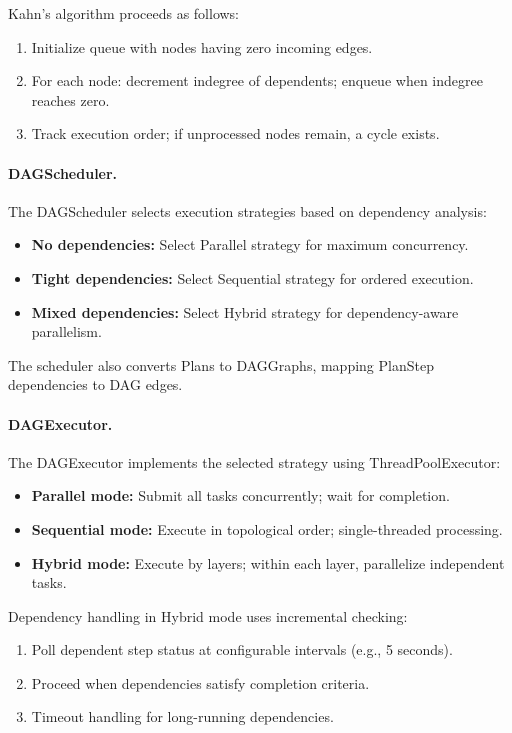 \documentclass{article}
\theoremstyle{definition}
\begin{document}
Kahn's algorithm proceeds as follows:
\begin{enumerate}[leftmargin=1.5em]
    \item Initialize queue with nodes having zero incoming edges.
    \item For each node: decrement indegree of dependents; enqueue when indegree reaches zero.
    \item Track execution order; if unprocessed nodes remain, a cycle exists.
\end{enumerate}

\paragraph{DAGScheduler.}
The DAGScheduler selects execution strategies based on dependency analysis:
\begin{itemize}[leftmargin=1.5em]
    \item \textbf{No dependencies:} Select Parallel strategy for maximum concurrency.
    \item \textbf{Tight dependencies:} Select Sequential strategy for ordered execution.
    \item \textbf{Mixed dependencies:} Select Hybrid strategy for dependency-aware parallelism.
\end{itemize}

The scheduler also converts Plans to DAGGraphs, mapping PlanStep dependencies to DAG edges.

\paragraph{DAGExecutor.}
The DAGExecutor implements the selected strategy using ThreadPoolExecutor:
\begin{itemize}[leftmargin=1.5em]
    \item \textbf{Parallel mode:} Submit all tasks concurrently; wait for completion.
    \item \textbf{Sequential mode:} Execute in topological order; single-threaded processing.
    \item \textbf{Hybrid mode:} Execute by layers; within each layer, parallelize independent tasks.
\end{itemize}

Dependency handling in Hybrid mode uses incremental checking:
\begin{enumerate}[leftmargin=1.5em]
    \item Poll dependent step status at configurable intervals (e.g., 5 seconds).
    \item Proceed when dependencies satisfy completion criteria.
    \item Timeout handling for long-running dependencies.
\end{enumerate}
\end{document}
